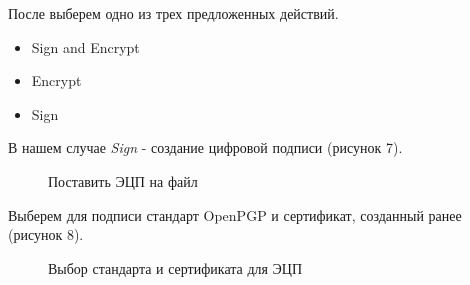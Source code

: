 \documentclass[10pt,a4paper]{report}
\begin{document}
После выберем одно из трех предложенных действий.
\begin{itemize}
\item Sign and Encrypt
\item Encrypt
\item Sign
\end{itemize} 
В нашем случае \textit{Sign} - создание цифровой подписи (рисунок 7).
\begin{figure}[h]
	\caption{Поставить ЭЦП на файл}
\end{figure}

Выберем для подписи стандарт OpenPGP и сертификат, созданный ранее (рисунок 8).
\begin{figure}[h]
	\caption{Выбор стандарта и сертификата для ЭЦП}
\end{figure}
\end{document}
